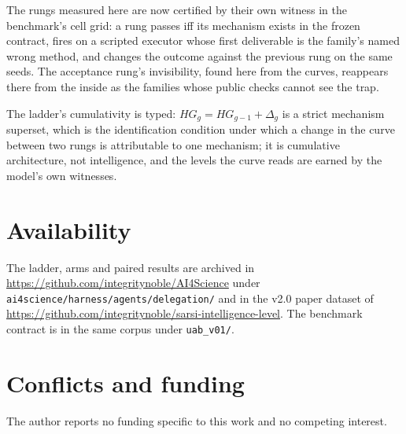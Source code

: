 The rungs measured here are now certified by their own witness in the benchmark's cell grid: a rung passes iff its mechanism exists in the frozen contract, fires on a scripted executor whose first deliverable is the family's named wrong method, and changes the outcome against the previous rung on the same seeds. The acceptance rung's invisibility, found here from the curves, reappears there from the inside as the families whose public checks cannot see the trap.

The ladder's cumulativity is typed: $HG_g = HG_{g-1} + \Delta_g$ is a strict mechanism superset, which is the identification condition under which a change in the curve between two rungs is attributable to one mechanism; it is cumulative architecture, not intelligence, and the levels the curve reads are earned by the model's own witnesses.

\section*{Availability}

The ladder, arms and paired results are archived in \url{https://github.com/integritynoble/AI4Science} under \texttt{ai4science/harness/agents/delegation/} and in the v2.0 paper dataset of \url{https://github.com/integritynoble/sarsi-intelligence-level}. The benchmark contract is in the same corpus under \texttt{uab\_v01/}.

\section*{Conflicts and funding}

The author reports no funding specific to this work and no competing interest.
